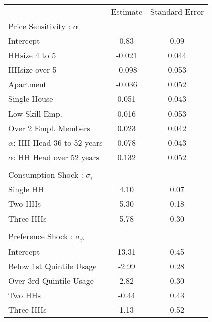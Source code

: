 \begin{tabular}{lcc}
& Estimate & Standard Error \\
Price Sensitivity : $\alpha$ & \multicolumn{2}{c}{}\\
\hline
Intercept &0.83&0.09\\
HHsize 4 to 5 &-0.021&0.044\\
HHsize over 5 &-0.098&0.053\\
Apartment &-0.036&0.052\\
Single House &0.051&0.043\\
Low Skill Emp. &0.016&0.053\\
Over 2 Empl. Members &0.023&0.042\\
$\alpha$: HH Head 36 to 52 years  &0.078&0.043\\
$\alpha$: HH Head over 52 years  &0.132&0.052\\
\multicolumn{3}{c}{} \\
Consumption Shock : $\sigma_{\epsilon}$ & \multicolumn{2}{c}{}\\
\hline
Single HH &4.10&0.07\\
Two HHs &5.30&0.18\\
Three HHs &5.78&0.30\\
\multicolumn{3}{c}{} \\
Preference Shock : $\sigma_{\psi}$ & \multicolumn{2}{c}{}\\
\hline
Intercept &13.31&0.45\\
Below 1st Quintile Usage &-2.99&0.28\\
Over 3rd Quintile Usage &2.82&0.30\\
Two HHs &-0.44&0.43\\
Three HHs &1.13&0.52\\
\hline
\end{tabular} 
